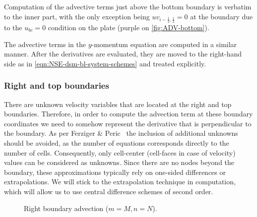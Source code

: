 \documentclass{article}
\numberwithin{equation}{section}
\begin{document}
Computation of the advective terms just above the bottom boundary is verbatim to the inner part, with the only exception being $uv_{i-\frac{1}{2},\frac{1}{2}}=0$ at the boundary due to the $u_{bc}=0$ condition on the plate (purple on \cref{fig:ADV-bottom}).

The advective terms in the $y$-momentum equation are computed in a similar manner. After the derivatives are evaluated, they are moved to the right-hand side as in \cref{eqn:NSE-dsm-bl-system-schemes} and treated explicitly. 

\subsubsection{Right and top boundaries}\label{subsubsec:advection-right}

There are unknown velocity variables that are located at the right and top boundaries. Therefore, in order to compute the advection term at these boundary coordinates we need to somehow represent the derivative that is perpendicular to the boundary. As per Ferziger \& Peric~\cite{Ferziger:2002} the inclusion of additional unknowns should be avoided, as the number of equations corresponds directly to the number of cells. Consequently, only cell-center (cell-faces in case of velocity) values can be considered as unknowns. Since there are no nodes beyond the boundary, these approximations typically rely on one-sided differences or extrapolations. We will stick to the extrapolation technique in computation, which will allow us to use central difference schemes of second order. 
\begin{figure}[H] %
  \caption{Right boundary advection ($m=M,n=N$).}\label{fig:ADV-right}
\end{figure}
\end{document}
